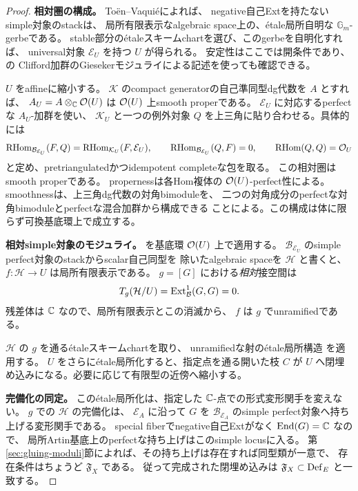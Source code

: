 \begin{proof}
\textbf{相対圏の構成。}
To\"en--Vaqui\'e\cite[Corollary 3.22]{TV}によれば、
negative自己Extを持たないsimple対象のstackは、
局所有限表示なalgebraic space上の、\'etale局所自明な
$\mathbb G_m$-gerbeである。
stable部分の\'etaleスキームchartを選び、このgerbeを自明化すれば、
universal対象 $\mathcal E_U$ を持つ $U$ が得られる。
安定性はここでは開条件であり、\cite[Proposition 6.3]{FP}の
Clifford加群のGiesekerモジュライによる記述を使っても確認できる。

$U$ をaffineに縮小する。
$\mathcal K$ のcompact generatorの自己準同型dg代数を $A$ とすれば、
$A_U=A\otimes_\mathbb C\mathcal O(U)$ は $\mathcal O(U)$ 上smooth properである。
$\mathcal E_U$ に対応するperfectな $A_U$-加群を使い、
$\mathcal K_U$ と一つの例外対象 $Q$ を上三角に貼り合わせる。具体的には
\[
 \operatorname{RHom}_{\mathcal B_{\mathcal E_U}}(F,Q)
   =\operatorname{RHom}_{\mathcal K_U}(F,\mathcal E_U),\qquad
 \operatorname{RHom}_{\mathcal B_{\mathcal E_U}}(Q,F)=0,\qquad
 \operatorname{RHom}(Q,Q)=\mathcal O_U
\]
と定め、pretriangulatedかつidempotent completeな包を取る。
この相対圏はsmooth properである。
propernessは各Hom複体の $\mathcal O(U)$-perfect性による。
smoothnessは、上三角dg代数の対角bimoduleを、
二つの対角成分のperfectな対角bimoduleとperfectな混合加群から構成できる
ことによる。この構成は体に限らず可換基底環上で成立する。

\textbf{相対simple対象のモジュライ。}
\cite[Corollaries 2.13, 3.15, 3.17, 3.22]{TV}を基底環 $\mathcal O(U)$ 上で適用する。
$\mathcal B_{\mathcal E_U}$ のsimple perfect対象のstackからscalar自己同型を
除いたalgebraic spaceを $\mathcal H$ と書くと、
$f:\mathcal H\to U$ は局所有限表示である。
$g=[G]$ における\emph{相対}接空間は
\[
 T_g(\mathcal H/U)=\operatorname{Ext}^1_{\mathcal B}(G,G)=0.
\]
残差体は $\mathbb C$ なので、局所有限表示とこの消滅から、
$f$ は $g$ でunramifiedである。

$\mathcal H$ の $g$ を通る\'etaleスキームchartを取り、
unramifiedな射の\'etale局所構造
\cite[Lemma 41.17.1, Tag 04HH]{StacksUnramified}を適用する。
$U$ をさらに\'etale局所化すると、指定点を通る開いた枝 $C$ が
$U$ へ閉埋め込みになる。必要に応じて有限型の近傍へ縮小する。

\textbf{完備化の同定。}
この\'etale局所化は、指定した $\mathbb C$-点での形式変形関手を変えない。
$g$ での $\mathcal H$ の完備化は、
$\mathcal E_A$ に沿って $G$ を
$\mathcal B_{\mathcal E_A}$ のsimple perfect対象へ持ち上げる変形関手である。
special fiberでnegative自己Extがなく $\operatorname{End}(G)=\mathbb C$ なので、
局所Artin基底上のperfectな持ち上げはこのsimple locusに入る。
第\ref{sec:gluing-moduli}節によれば、その持ち上げは存在すれば同型類が一意で、
存在条件はちょうど $\mathfrak F_X$ である。
従って完成された閉埋め込みは
$\mathfrak F_X\subset\operatorname{Def}_E$ と一致する。
\end{proof}


